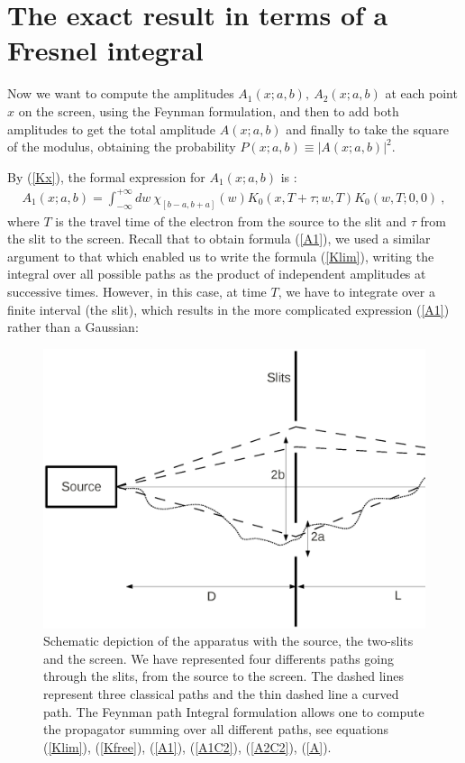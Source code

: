 \documentclass[12pt]{article}   %
\begin{document}
\section{The exact result in terms of a Fresnel integral}

Now we want to compute the amplitudes $A_1(x;a,b),\ A_2(x;a,b)$
at each point $x$ on the screen, using the Feynman formulation,
and then to add both amplitudes to get the total amplitude
$A(x;a,b)$ and finally to take the square of the modulus,
obtaining the probability $P(x;a,b)\equiv |A(x;a,b)|^2$.

By (\ref{Kx}), the formal expression for $A_1(x;a,b)$ is :
\begin{eqnarray}\label{A1}
A_1(x;a,b)=\int_{-\infty}^{+\infty} dw\ \chi_{[b-a,b+a]}(w)
K_0(x,T+\tau;w,T) K_0(w,T;0,0)\ ,
\end{eqnarray}
where $T$ is the travel time of the electron from the source to
the slit and $\tau$ from the slit to the screen. 
Recall that to obtain formula
(\ref{A1}), we used a similar argument to that which enabled us to
write the formula (\ref{Klim}), writing the integral over all
possible paths as the product of independent amplitudes at
successive times. However, in this case, at time $ T $, we have to
integrate over a finite interval (the slit), which results in the
more complicated expression (\ref{A1}) rather than a Gaussian:

\begin{figure}
 \centering
\includegraphics[width=130mm]{Fig1.ps}
\caption{\label{Fig.1} Schematic depiction of the apparatus with
the source, the two-slits and the screen.
We have represented four differents paths going through the slits, from the source to the screen.
{The dashed lines represent three classical paths and the thin dashed line a curved path.
The Feynman path Integral formulation allows one to compute the propagator 
summing over all different paths, see equations 
(\ref{Klim}), (\ref{Kfree}), (\ref{A1}), (\ref{A1C2}), (\ref{A2C2}), (\ref{A}).}}
\end{figure}
\end{document}
